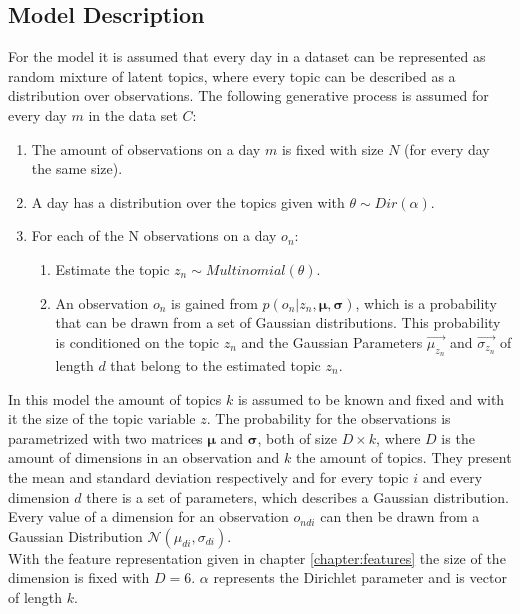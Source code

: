 
\subsection{Model Description}
  
  For the model it is assumed that every day in a dataset can be represented as random mixture of latent topics, where every topic can be described as a distribution over observations. The following generative process is assumed for every day $m$ in the data set $C$:
\begin{enumerate}
 \item The amount of observations on a day $m$ is fixed with size $N$ (for every day the same size).
 \item A day has a distribution over the topics given with $\theta \sim Dir(\alpha)$.
 \item For each of the N observations on a day $o_n$:
 
 \begin{enumerate}
  \item Estimate the topic $z_n \sim Multinomial(\theta)$.
  \item An observation $o_n$ is gained from $p(o_n |z_n,\boldsymbol\mu,\boldsymbol\sigma)$,  which is a probability that can be drawn from a set of Gaussian distributions. This probability is conditioned on the topic $z_n$ and the Gaussian Parameters $\vec{\mu_{z_n}}$ and $\vec{\sigma_{z_n}}$ of length $d$ that belong to the estimated topic $z_n$.
 \end{enumerate}

\end{enumerate}
  
In this model the amount of topics $k$ is assumed to be known and fixed and with it the size of the topic variable $z$.
The probability for the observations is parametrized with two matrices $\boldsymbol\mu$ and $\boldsymbol\sigma$, both of size $D\times k$, where $D$ is the amount of dimensions in an observation and $k$ the amount of topics. They present the mean and standard deviation respectively and for every topic $i$ and every dimension $d$ there is a set of parameters, which describes a Gaussian distribution. Every value of a dimension for an observation $o_{ndi}$ can then be drawn from a Gaussian Distribution $\mathcal{N}(\mu_{di},\sigma_{di})$.\\
With the feature representation given in chapter \ref{chapter:features} the size of the dimension is fixed with $D=6$. $\alpha$ represents the Dirichlet parameter and is vector of length $k$.

